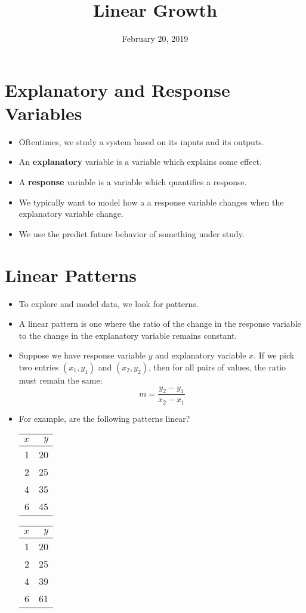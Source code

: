 \documentclass{article}
\title{Linear Growth}
\date{February 20, 2019}
\begin{document}
\maketitle
\section*{Explanatory and Response Variables}
\begin{itemize}
	\item Oftentimes, we study a system based on its inputs and its outputs.
	\item An {\bf explanatory} variable is a variable which explains some effect.
	\item A {\bf response} variable is a variable which quantifies a response.
	\item We typically want to model how a a response variable changes when the explanatory variable change.
	\item We use the predict future behavior of something under study.
\end{itemize}

\section*{Linear Patterns}
\begin{itemize}
	\item To explore and model data, we look for patterns.
	\item A linear pattern is one where the ratio of the change in the response variable to the change in the explanatory variable remains constant.
	\item Suppose we have response variable $y$ and explanatory variable $x$.  If we pick 
	two entries $(x_1, y_1)$ and $(x_2, y_2)$, then for all pairs of values, the ratio must remain the same:
	\[
	m = \dfrac{y_2 - y_1}{x_2-x_1}
	\]
	\item For example, are the following patterns linear?\newline
	\begin{tabular}{|r|r|}
		\hline
		$x$ & $y$ \\
		\hline
		1 & 20\\
		2 & 25\\
		4 & 35\\
		6 & 45\\
		\hline
	\end{tabular}
	\begin{tabular}{|r|r|}
		\hline
		$x$ & $y$ \\
		\hline
		1 & 20\\
		2 & 25\\
		4 & 39\\
		6 & 61\\
		\hline
	\end{tabular}
\end{itemize}
\end{document}
